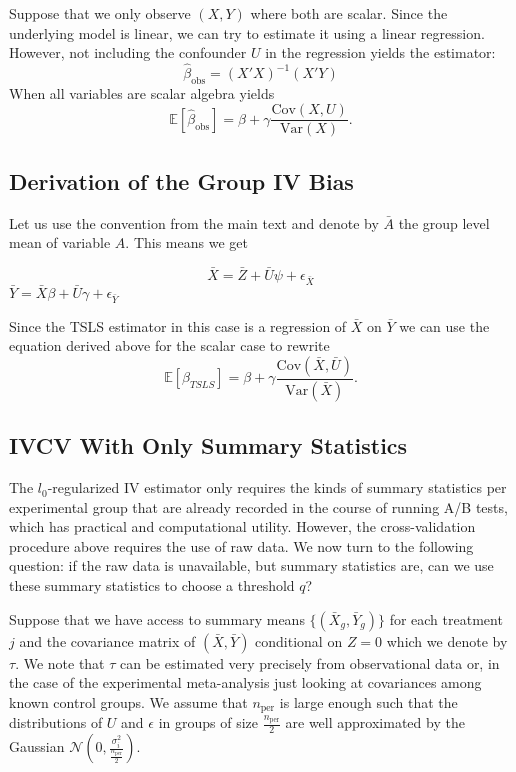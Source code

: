 \documentclass{article}
\newcommand\E{\mathbb{E}}
\newcommand\Var{\text{Var}}
\newcommand\Cov{\text{Cov}}
\newcommand\nper{{n_{\text{per}}}}
\begin{document}
Suppose that we only observe $(X,Y)$ where both are scalar. Since the underlying model is linear, we can try to estimate it using a linear regression. However, not including the confounder $U$ in the regression yields the estimator: 
\begin{equation}
\label{eq:ols}
\hat{\beta}_\text{obs} = (X' X)^{-1} (X' Y)
\end{equation}
When all variables are scalar algebra yields
$$
\E [\hat{\beta}_\text{obs}] = \beta + \gamma \frac{\Cov(X,U)}{\Var(X)}.
$$ 

\subsection{Derivation of the Group IV Bias}
Let us use the convention from the main text and denote by $\bar{A}$ the group level mean of variable $A.$ This means we get 

$$\bar{X} = \bar{Z} + \bar{U} \psi + \epsilon_{\bar{X}}$$ $\bar{Y} = \bar{X} \beta + \bar{U} \gamma + \epsilon_{\bar{Y}}$ 

Since the TSLS estimator in this case is a regression of $\bar{X}$ on $\bar{Y}$ we can use the equation derived above for the scalar case to rewrite $$\E [\beta_{TSLS}] = \beta + \gamma \frac{\Cov(\bar{X}, \bar{U})}{\Var(\bar{X})}.$$

\subsection{IVCV With Only Summary Statistics}
The $l_0$-regularized IV estimator only requires the kinds of summary statistics per experimental group that are already recorded in the course of running A/B tests, which has practical and computational utility. However, the cross-validation procedure above requires the use of raw data. We now turn to the following question: if the raw data is unavailable, but summary statistics are, can we use these summary statistics to choose a threshold $q$?

Suppose that we have access to summary means $\lbrace (\bar{X}_g, \bar{Y}_g) \rbrace$ for each treatment $j$ and the covariance matrix of $(\bar{X}, \bar{Y})$ conditional on $Z=0$ which we denote by $\tau$. We note that $\tau$ can be estimated very precisely from observational data or, in the case of the experimental meta-analysis just looking at covariances among known control groups. We assume that $\nper$ is large enough such that the distributions of $U$ and $\epsilon$ in groups of size $\frac{\nper}{2}$ are well approximated by the Gaussian $\mathcal{N}(0, \frac{\sigma^2_i}{\frac{\nper}{2}}).$ 
\end{document}
